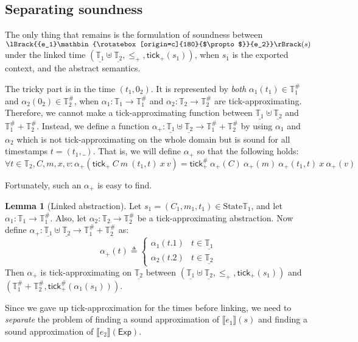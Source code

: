 \documentclass[acmsmall,review]{acmart}\settopmatter{printfolios=true,printccs=false,printacmref=false}
\theoremstyle{definition}
\newtheorem{lem}{Lemma}[section]
\newcommand*{\A}[1]{{#1}^{\#}}
\newcommand*{\Time}{\mathbb{T}}
\newcommand*{\ATime}{\A{\Time}}
\newcommand*{\mem}{m}
\newcommand*{\State}{\text{State}}
\newcommand*{\semlink}{\mathbin{\rotatebox[origin=c]{180}{$\propto$}}}
\newcommand*{\link}[2]{{#1}\semlink{#2}}
\newcommand*{\Exp}{\mathsf{Exp}}
\newcommand*{\sembracket}[1]{\lBrack{#1}\rBrack}
\newcommand*{\tick}{\mathsf{tick}}
\begin{document}
\subsection{Separating soundness}
The only thing that remains is the formulation of soundness between $\sembracket{\link{e_1}{e_2}}(s)$ under the linked time $(\underline{\Time_1}\uplus\underline{\Time_2},\le_+,\tick_{+}(s_1))$, when $s_1$ is the exported context, and the abstract semantics.

The tricky part is in the time $(t_1,0_2)$.
It is represented by \emph{both} $\alpha_1(t_1)\in\ATime_1$ and $\alpha_2(0_2)\in\ATime_2$, when $\alpha_1:\Time_1\rightarrow\ATime_1$ and $\alpha_2:\Time_2\rightarrow\ATime_2$ are tick-approximating.
Therefore, we cannot make a tick-approximating function between $\underline{\Time_1}\uplus\underline{\Time_2}$ and $\ATime_1+\ATime_2$.
Instead, we define a function $\alpha_+:\underline{\Time_1}\uplus\underline{\Time_2}\rightarrow\ATime_1+\ATime_2$ by using $\alpha_1$ and $\alpha_2$ which is not tick-approximating on the whole domain but is sound for all timestamps $t=(t_1,\_)$.
That is, we will define $\alpha_+$ so that the following holds:
\[
  \forall t\in\Time_2,C,\mem,x,v:\alpha_+(\tick_+\:C\:\mem\:(t_1,t)\:x\:v)=\A\tick_+\:\alpha_+(C)\:\alpha_+(\mem)\:\alpha_+(t_1,t)\:x\:\alpha_+(v)
\]

Fortunately, such an $\alpha_+$ is easy to find.
\begin{lem}[Linked abstraction]
  Let $s_1=(C_1,\mem_1,t_1)\in\State{\Time_1}$, and let $\alpha_1:\Time_1\rightarrow\ATime_1$.
  Also, let $\alpha_2:\Time_2\rightarrow\ATime_2$ be a tick-approximating abstraction.
  Now define $\alpha_+:\underline{\Time_1}\uplus\underline{\Time_2}\rightarrow\ATime_1+\ATime_2$ as:
  \[
    \alpha_+(t)\triangleq
    \begin{cases}
      \alpha_1(t.1) & t\in\underline{\Time_1} \\
      \alpha_2(t.2) & t\in\underline{\Time_2}
    \end{cases}
  \]
  Then $\alpha_+$ is tick-approximating on $\underline{\Time_2}$ between $(\underline{\Time_1}\uplus\underline{\Time_2},\le_+,\tick_+(s_1))$ and $(\ATime_1+\ATime_2,\A\tick_+(\alpha_1(s_1)))$.
\end{lem}

Since we gave up tick-approximation for the times before linking, we need to \emph{separate} the problem of finding a sound approximation of $\sembracket{e_1}(s)$ and finding a sound approximation of $\sembracket{e_2}(\Exp)$.
\end{document}
